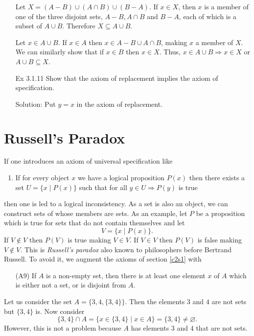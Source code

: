 \begin{enumerate}
Let $X = (A - B) \cup (A \cap B) \cup (B - A)$. If $x \in X$, then $x$ is
a member of one of the three disjoint sets, $A - B, A \cap B$ and $B - A$,
each of which is a subset of $A \cup B$. Therefore $X \subseteq A \cup B$.

Let $x \in A \cup B$. If $x \in A$ then $x \in A - B \cup A \cap B$, making
$x$ a member of $X$. We can similarly show that if $x \in B$ then $x \in
X$. Thus, $x \in A \cup B \Rightarrow x \in X$ or $A \cup B \subseteq X$.

\item[Ex 3.1.11 ] Show that the axiom of replacement implies the axiom of
specification.
\item[Solution: ] Put $y = x$ in the axiom of replacement.
\end{enumerate}

\section{Russell's Paradox}\label{c2s2}
If one introduces an axiom of universal specification like
\begin{enumerate}
\item If for every object $x$ we have a logical
proposition $P(x)$ then there exists a set $U = \{x \;|\; P(x)\}$ such that
for all $y \in U \Rightarrow P(y)$ is true
\end{enumerate}
then one is led to a logical inconsistency. As a set is also an object, we
can construct sets of whose members are sets. As an example, let $P$ be
a proposition which is true for sets that do not contain themselves and
let
\begin{equation}
V = \{x \;|\; P(x)\}.
\end{equation}
If $V \notin V$ then $P(V)$ is true making $V \in V$. If $V \in V$ then
$P(V)$ is false making $V \notin V$. This is \emph{Russell's paradox} also
known to philosophers before Bertrand Russell. To avoid it, we augment the
axioms of section \ref{c2s1} with
\begin{enumerate}
\item[(A9)] If $A$ is a non-empty set, then there is at least one element
$x$ of $A$ which is either not a set, or is disjoint from $A$.
\end{enumerate}

Let us consider the set $A = \{3, 4, \{3, 4\}\}$. Then the elements $3$
and $4$ are not sets but $\{3, 4\}$ is. Now consider 
\[
\{3, 4\} \cap A = \{x \in \{3, 4\} \;|\; x \in A\} = \{3,  4\} \ne
\varnothing.
\]
However, this is not a problem because $A$ has elements $3$ and $4$ that
are not sets.

